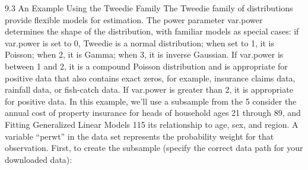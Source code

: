 9.3 An Example Using the Tweedie Family
The Tweedie family of distributions provide flexible models for estimation. The power
parameter var.power determines the shape of the distribution, with familiar models as special
cases: if var.power is set to 0, Tweedie is a normal distribution; when set to 1, it is Poisson;
when 2, it is Gamma; when 3, it is inverse Gaussian. If var.power is between 1 and 2, it is a
compound Poisson distribution and is appropriate for positive data that also contains exact
zeros, for example, insurance claims data, rainfall data, or fish-catch data. If var.power is
greater than 2, it is appropriate for positive data.
In this example, we’ll use a subsample from the 5%
consider the annual cost of property insurance for heads of household ages 21 through 89, and 
Fitting Generalized Linear Models 115
its relationship to age, sex, and region. A variable “perwt” in the data set represents the
probability weight for that observation. First, to create the subsample (specify the correct data
path for your downloaded data):


